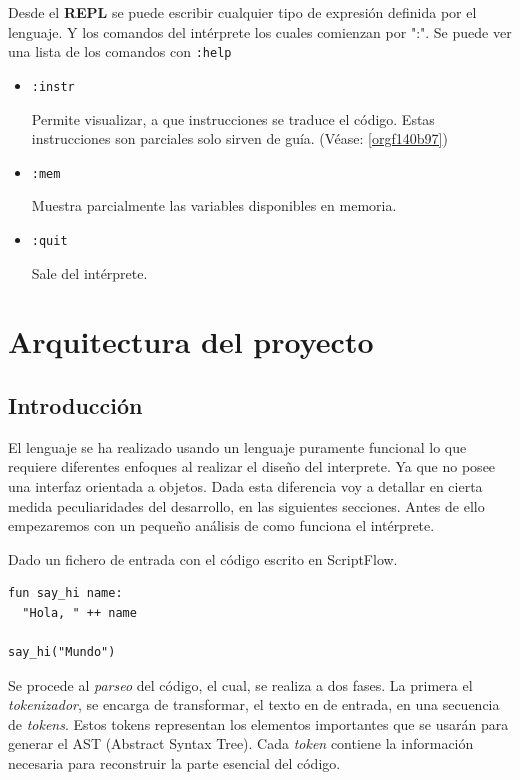 \documentclass[11pt]{article}
\begin{document}
Desde el \textbf{REPL} se puede escribir cualquier tipo de expresión definida por el
lenguaje. Y los comandos del intérprete los cuales comienzan por ":". Se
puede ver una lista de los comandos con \texttt{:help}

\begin{itemize}
\item \texttt{:instr}

Permite visualizar, a que instrucciones se traduce el código. Estas
instrucciones son parciales solo sirven de guía. (Véase: \ref{orgf140b97})

\item \texttt{:mem}

Muestra parcialmente las variables disponibles en memoria.

\item \texttt{:quit}

Sale del intérprete.
\end{itemize}

\section{Arquitectura del proyecto}
\label{sec:orgf6ba300}

\subsection{Introducción}
\label{sec:orga5ac0e8}

El lenguaje se ha realizado usando un lenguaje puramente funcional lo que
requiere diferentes enfoques al realizar el diseño del interprete. Ya que
no posee una interfaz orientada a objetos. Dada esta diferencia voy a
detallar en cierta medida peculiaridades del desarrollo, en las siguientes
secciones. Antes de ello empezaremos con un pequeño análisis de como
funciona el intérprete.

Dado un fichero de entrada con el código escrito en ScriptFlow.

\begin{verbatim}
fun say_hi name:
  "Hola, " ++ name

say_hi("Mundo")
\end{verbatim}


Se procede al \emph{parseo} del código, el cual, se realiza a dos fases. La primera el
\emph{tokenizador}, se encarga de transformar, el texto en de entrada, en una
secuencia de \emph{tokens}. Estos tokens representan los elementos importantes
que se usarán para generar el AST (Abstract Syntax Tree). Cada \emph{token} contiene la información
necesaria para reconstruir la parte esencial del código.
\end{document}

